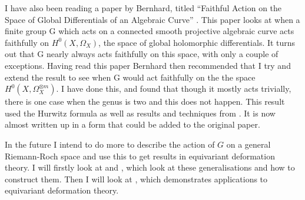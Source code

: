 \documentclass[11pt]{article} %
\begin{document}
I have also been reading a paper by Bernhard, titled “Faithful Action on the Space of Global Differentials of an Algebraic Curve” \citep[K{\"o}]{faithfulaction}. This paper looks at when a finite group G which acts on a connected smooth projective algebraic curve acts faithfully on $H^0(X, \Omega_X)$, the space of global holomorphic differentials. It turns out that G nearly always acts faithfully on this space, with only a couple of exceptions. Having read this paper Bernhard then recommended that I try and extend the result to see when G would act faithfully on the the space $H^0(X, \Omega^{\otimes{m}}_X)$. I have done this, and found that though it mostly acts trivially, there is one case when the genus is two and this does not happen. This result used the Hurwitz formula as well as results and techniques from \citep[K{\"o}]{faithfulaction}. It is now almost written up in a form that could be added to the original paper.

In the future I intend to do more to describe the action of $G$ on a general Riemann-Roch space and use this to get results in equivariant deformation theory. I will firstly look at \citep[Bo]{cohogsheaves} and \citep[K{\"o}]{galiosstruc}, which look at these generalisations and how to construct them. Then I will look at \citep[K{\"o}; Ko]{quaddiffequi}, which demonstrates applications to equivariant deformation theory.





\end{document}
